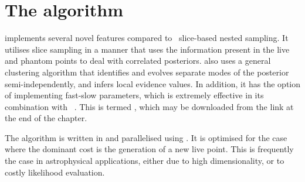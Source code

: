 \section{The \PolyChord{} algorithm}
\label{sec:pc:polychord_algorithm}

\PolyChord{} implements several novel features compared to~ slice-based nested sampling.  
It utilises slice sampling in a manner that uses the information present in the live and phantom points to deal with correlated posteriors. 
\PolyChord{} also uses a general clustering algorithm that identifies and evolves separate modes of the posterior semi-independently, and infers local evidence values.  
In addition, it has the option of implementing fast-slow parameters, which is extremely effective in its combination with \CosmoMC{}~\citep{cosmomc}. 
This is termed \CosmoChord, which may be downloaded from the link at the end of the chapter.

 The algorithm is written in \FORTRAN{} and parallelised using \openMPI{}.  It is optimised for the case where the dominant cost is the generation of a new live point.  This is frequently the case in astrophysical applications, either due to high dimensionality, or to costly likelihood evaluation.  


